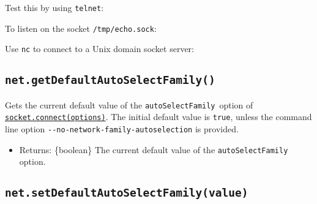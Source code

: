 Test this by using \texttt{telnet}:

\begin{Shaded}
\begin{Highlighting}[]
\end{Highlighting}
\end{Shaded}

To listen on the socket \texttt{/tmp/echo.sock}:

\begin{Shaded}
\begin{Highlighting}[]
\NormalTok{(}\OperatorTok{,}\NormalTok{ () }\KeywordTok{=\textgreater{}}\NormalTok{ \{}
  \NormalTok{(}\NormalTok{)}\OperatorTok{;}
\NormalTok{\})}\OperatorTok{;}
\end{Highlighting}
\end{Shaded}

Use \texttt{nc} to connect to a Unix domain socket server:

\begin{Shaded}
\begin{Highlighting}[]
 
\end{Highlighting}
\end{Shaded}

\subsection{\texorpdfstring{\texttt{net.getDefaultAutoSelectFamily()}}{net.getDefaultAutoSelectFamily()}}\label{net.getdefaultautoselectfamily}

Gets the current default value of the \texttt{autoSelectFamily}~option
of
\hyperref[socketconnectoptions-connectlistener]{\texttt{socket.connect(options)}}.
The initial default value is \texttt{true}, unless the command line
option \texttt{-\/-no-network-family-autoselection} is provided.

\begin{itemize}
\tightlist
\item
  Returns: \{boolean\} The current default value of the
  \texttt{autoSelectFamily} option.
\end{itemize}

\subsection{\texorpdfstring{\texttt{net.setDefaultAutoSelectFamily(value)}}{net.setDefaultAutoSelectFamily(value)}}\label{net.setdefaultautoselectfamilyvalue}

